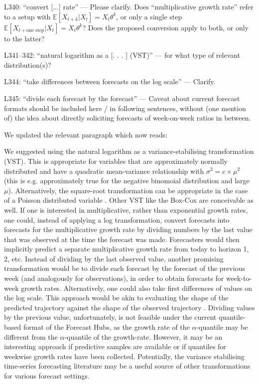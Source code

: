 \documentclass{article}
\newcommand{\black}{\color{black}}
\newcommand{\blue}{\color{blue}}
\newcommand{\indented}{\setlength{\leftskip}{1cm}}
\newcommand{\notindented}{\setlength{\leftskip}{0cm}}
\begin{document}
\notindented

\blue
L340: “convert [...] rate” — Please clarify. Does “multiplicative growth rate” refer to a setup with $\mathbb{E}[X_{t+k} | X_t] = X_t \theta^k$, or only a single step $\mathbb{E}[X_{t+\text{one step}} | X_t] = X_t \theta^k$? Does the proposed conversion apply to both, or only to the latter?

\blue
L341–342: “natural logarithm as a [. . . ] (VST)” — for what type of relevant distribution(s)?

\blue
L344: “take differences between forecasts on the log scale” — Clarify.

L345: “divide each forecast by the forecast” — Caveat about current forecast formats should be included here / in following sentences, without (one mention of) the idea about directly soliciting forecasts of week-on-week ratios in between.

\black
We updated the relevant paragraph which now reads:

\indented

We suggested using the natural logarithm as a variance-stabilising transformation (VST). This is appropriate for variables that are approximately normally distributed and have a quadratic mean-variance relationship with $\sigma^2 = c \times \mu^2$ (this is e.g. approximately true for the negative binomoial distribution and large $\mu$). Alternatively, the square-root transformation can be appropriate in the case of a Poisson distributed variable \citep{dunnGeneralizedLinearModels2018}. Other VST like the Box-Cox \citep{boxAnalysisTransformations1964} are conceivable as well.
If one is interested in multiplicative, rather than exponential growth rates, one could, instead of applying a log transformation, convert forecasts into forecasts for the multiplicative growth rate by dividing numbers by the last value that was observed at the time the forecast was made. Forecasters would then implicitly predict a separate multiplicative growth rate from today to horizon 1, 2, etc. 
Instead of dividing by the last observed value, another promising transformation would be to divide each forecast by the forecast of the previous week (and analogously for observations), in order to obtain forecasts for week-to-week growth rates. Alternatively, one could also take first differences of values on the log scale. This approach would be akin to evaluating the shape of the predicted trajectory against the shape of the observed trajectory \citep[for a different approach to evaluating the shape of a forecast, see][]{srivastavaShapebasedEvaluationEpidemic2022}. Dividing values by the previous value, unfortunately, is not feasible under the current quantile-based format of the Forecast Hubs, as the growth rate of the $\alpha$-quantile may be different from the $\alpha$-quantile of the growth-rate. However, it may be an interesting approach if predictive samples are available or if quantiles for weekwise growth rates have been collected. Potentially, the variance stabilising time-series forecasting literature may be a useful source of other transformations for various forecast settings. 
\end{document}
